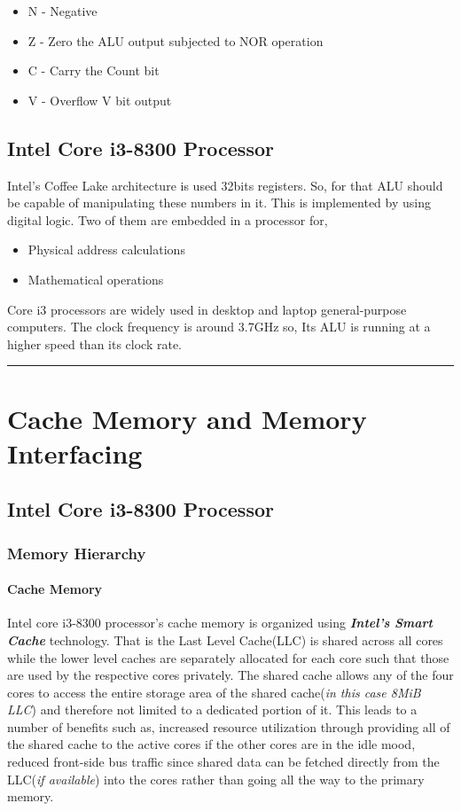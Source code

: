 \documentclass[a4paper,11pt]{article}
\begin{document}
\begin{itemize}
	\item 	N - Negative
\item	Z - Zero the ALU output subjected to NOR operation
\item 	C - Carry the Count bit
\item	V - Overflow V bit output
\end{itemize}

\subsection{Intel Core i3-8300 Processor}

Intel's Coffee Lake architecture is used 32bits registers. So, for that ALU should be capable of manipulating these numbers in it. This is implemented by using digital logic. Two of them are embedded in a processor for,
\begin{itemize}
	\item 	Physical address calculations
	\item	Mathematical operations

\end{itemize}

Core i3 processors are widely used in desktop and laptop general-purpose computers. The clock frequency is around 3.7GHz so, Its ALU is running at a higher speed than its clock rate.

\vspace{1cm}\hrule
\section{Cache Memory and Memory Interfacing}

\subsection{Intel Core i3-8300 Processor}

\subsubsection{Memory Hierarchy}

\paragraph{Cache Memory}
Intel core i3-8300 processor's cache memory is organized using \textbf{\textit{Intel's Smart Cache}} technology. That is the Last Level Cache(LLC) is shared across all cores while the lower level caches are separately allocated for each core such that those  are used by the respective cores privately. The shared cache allows any of the four cores to access the entire storage area of the shared cache(\textit{in this case 8MiB LLC}) and therefore not limited to a dedicated portion of it. This leads to a number of benefits such as, increased resource utilization through providing all of the shared cache to the active cores if the other cores are in the idle mood, reduced front-side bus traffic since shared data can be fetched directly from the LLC(\textit{if available}) into the cores  rather than going all the way to the primary memory\cite{smartcache}.\\
\end{document}
